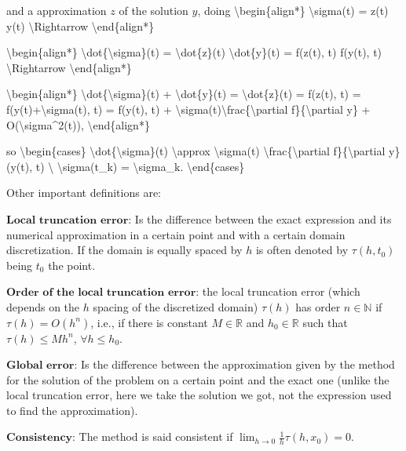 \documentclass[letterpaper,10pt,english]{jupyterBook}
\begin{document}
\sphinxAtStartPar
and a approximation \(z\) of the solution \(y\), doing
\textbackslash{}begin\{align*\}
\textbackslash{}sigma(t) = z(t) \sphinxhyphen{} y(t) \textbackslash{}Rightarrow
\textbackslash{}end\{align*\}

\sphinxAtStartPar
\textbackslash{}begin\{align*\}
\textbackslash{}dot\{\textbackslash{}sigma\}(t) = \textbackslash{}dot\{z\}(t) \sphinxhyphen{} \textbackslash{}dot\{y\}(t) = f(z(t), t) \sphinxhyphen{} f(y(t), t) \textbackslash{}Rightarrow
\textbackslash{}end\{align*\}

\sphinxAtStartPar
\textbackslash{}begin\{align*\}
\textbackslash{}dot\{\textbackslash{}sigma\}(t) + \textbackslash{}dot\{y\}(t) = \textbackslash{}dot\{z\}(t) = f(z(t), t) = f(y(t)+\textbackslash{}sigma(t), t) = f(y(t), t) + \textbackslash{}sigma(t)\textbackslash{}frac\{\textbackslash{}partial f\}\{\textbackslash{}partial y\} + O(\textbackslash{}sigma\textasciicircum{}2(t)),
\textbackslash{}end\{align*\}

\sphinxAtStartPar
so
\textbackslash{}begin\{cases\}
\textbackslash{}dot\{\textbackslash{}sigma\}(t) \textbackslash{}approx \textbackslash{}sigma(t) \textbackslash{}frac\{\textbackslash{}partial f\}\{\textbackslash{}partial y\} (y(t), t) \textbackslash{}
\textbackslash{}sigma(t\_k) = \textbackslash{}sigma\_k.
\textbackslash{}end\{cases\}

\sphinxAtStartPar
Other important definitions are:

\sphinxAtStartPar
\(\textbf{Local truncation error:}\) Is the difference between the exact expression and its numerical approximation in a certain point and with a certain domain discretization. If the domain is equally spaced by \(h\) is often denoted by \(\tau(h,t_0)\) being \(t_0\) the point.

\sphinxAtStartPar
\(\textbf{Order of the local truncation error:}\) the local truncation error (which depends on the \(h\) spacing of the discretized domain) \(\tau(h)\) has order \(n \in \mathbb{N}\) if \(\tau(h) = O(h^n) \), i.e., if there is constant \(M \in \mathbb{R}\) and \(h_0 \in \mathbb{R}\) such that \(\tau(h) \leq M h^n\), \(\forall h \leq h_0\).

\sphinxAtStartPar
\(\textbf{Global error:}\) Is the difference between the approximation given by the method for the solution of the problem on a certain point and the exact one (unlike the local truncation error, here we take the solution we got, not the expression used to find the approximation).

\sphinxAtStartPar
\(\textbf{Consistency:}\) The method is said consistent if \(\lim _{h \to 0} \frac{1}{h}\tau(h,x_0) = 0\).
\end{document}
